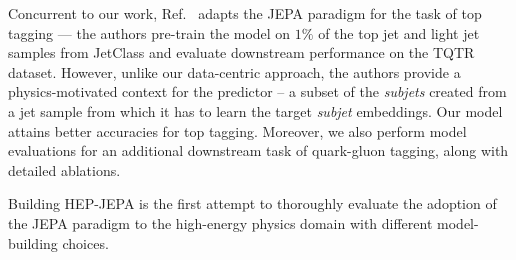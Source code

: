 Concurrent to our work, Ref.~\cite{katel2024learningsymmetryindependentjetrepresentations} adapts the JEPA paradigm for the task of top tagging --- the authors pre-train the model on $1\%$ of the top jet and light jet samples from JetClass and evaluate downstream performance on the TQTR dataset. However, unlike our data-centric approach, the authors provide a physics-motivated context for the predictor -- a subset of the \emph{subjets} created from a jet sample from which it has to learn the target \emph{subjet} embeddings. Our model attains better accuracies for top tagging. Moreover, we also perform model evaluations for an additional downstream task of quark-gluon tagging, along with detailed ablations.

Building HEP-JEPA is the first attempt to thoroughly evaluate the adoption of the JEPA paradigm to the high-energy physics domain with different model-building choices.